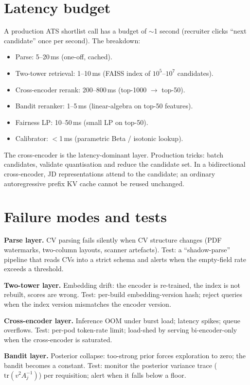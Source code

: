 \documentclass[11pt,oneside]{scrbook}
\begin{document}
\section{Latency budget}

A production ATS shortlist call has a budget of $\sim$1 second (recruiter
clicks ``next candidate'' once per second). The breakdown:

\begin{itemize}\setlength\itemsep{1pt}
  \item Parse: 5--20\,ms (one-off, cached).
  \item Two-tower retrieval: 1--10\,ms (FAISS index of $10^5$--$10^7$ candidates).
  \item Cross-encoder rerank: 200--800\,ms (top-1000 $\to$ top-50).
  \item Bandit reranker: 1--5\,ms (linear-algebra on top-50 features).
  \item Fairness LP: 10--50\,ms (small LP on top-50).
  \item Calibrator: $<$1\,ms (parametric Beta / isotonic lookup).
\end{itemize}

The cross-encoder is the latency-dominant layer. Production tricks: batch candidates, validate quantisation and reduce the candidate set.
In a bidirectional cross-encoder, JD representations attend to the candidate;
an ordinary autoregressive prefix KV cache cannot be reused unchanged.

\section{Failure modes and tests}

\textbf{Parse layer.} CV parsing fails silently when CV structure changes
(PDF watermarks, two-column layouts, scanner artefacts). Test: a
``shadow-parse'' pipeline that reads CVs into a strict schema and alerts
when the empty-field rate exceeds a threshold.

\textbf{Two-tower layer.} Embedding drift: the encoder is re-trained, the
index is not rebuilt, scores are wrong. Test: per-build embedding-version
hash; reject queries when the index version mismatches the encoder version.

\textbf{Cross-encoder layer.} Inference OOM under burst load; latency
spikes; queue overflows. Test: per-pod token-rate limit; load-shed by
serving bi-encoder-only when the cross-encoder is saturated.

\textbf{Bandit layer.} Posterior collapse: too-strong prior forces
exploration to zero; the bandit becomes a constant. Test: monitor the
posterior variance trace ($\mathrm{tr}(v^2 A_j^{-1})$) per requisition;
alert when it falls below a floor.
\end{document}
